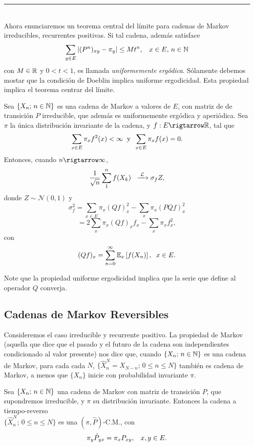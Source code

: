 \rule{0.7em}{0.7em}\\ \newline
Ahora enunciaremos un teorema central del límite para cadenas de Markov irreducibles, recurrentes positivas. Si tal cadena, además satisface
\[\sum_{y \in E}|(P^n)_{xy}-\pi_y| \leq Mt^n,\hspace{0.3cm}x \in E,\,n\in \mathbb N\]
con $M\in \mathbb R$ y $0<t<1$, es llamada \textit{uniformemente ergódica}. Sólamente debemos mostar que la condición de Doeblin implica uniforme ergodicidad. Esta propiedad implica el teorema centrar del límite.

\begin{teorema}
Sea $\{X_n;\,n\in \mathbb N\}$ es una cadena de Markov a valores de $E$, con matriz de de transición $P$ irreducible, que además es uniformemente ergódica y aperiódica. Sea $\pi$ la única distribución invariante de la cadena, y $f:E\rigtarrow \R$, tal que
\[\sum_{x\in E}\pi_x f^2(x) < \infty \hspace{0.2cm}\text{y}\hspace{0.2cm}\sum_{x \in E}\pi_x f(x) = 0.\]
Entonces, cuando $n\rigtarrow \infty$,
\[\frac{1}{\sqrt{n}}\sum_1^nf(X_k)\hspace{0.2cm}\xrightarrow{\,\,\mathcal{L}\,\,}\sigma_f Z,\]
donde $Z\sim \mathcal{N}(0,1)$ y
\[\sigma_f^2 = \sum_{x \in E}\pi_x (Qf)_x^2 - \sum_x \pi_x (PQf)_x^2\]
\[= 2\sum_x \pi_x (Qf)_x f_x - \sum_x \pi_x f_x^2,\]
con 
\[(Qf)_x = \sum_{n=0}^{\infty}\mathbb E_x\left[f(X_n)\right],\hspace{0.2cm}x\in E.\]
\end{teorema}

Note que la propiedad uniforme ergodicidad implica que la serie que define al operador $Q$ converja.

\subsection{Cadenas de Markov Reversibles}
Consideremos el caso irreducible y recurrente positivo. La propiedad de Markov (aquella que dice que el pasado y el futuro de la cadena son independientes condicionado al valor presente) nos dice que, cuando $\{X_n;\,n\in \mathbb N\}$ es una cadena de Markov, para cada cada $N$, $\{\hat{X}_n^N = X_{N-n};\,0\leq n \leq N\}$ también es cadena de Markov, a menos que $\{X_n\}$ inicie con probabilidad invariante $\pi$.
\begin{prop}
Sea $\{X_n;\,n\in\mathbb N\}$ una cadena de Markov con matriz de transición $P$, que supondremos irreducible, y $\pi$ su distribución invariante. Entonces la cadena a tiempo-reverso\\ $\{\hat{X}_n^N;\,0\leq n\leq N\}$ es una $(\pi,\hat{P})$-C.M., con
\[\pi_y \hat{P}_{yx} = \pi_x P_{xy},\hspace{0.3cm}x,y\in E.\]
\end{prop}

